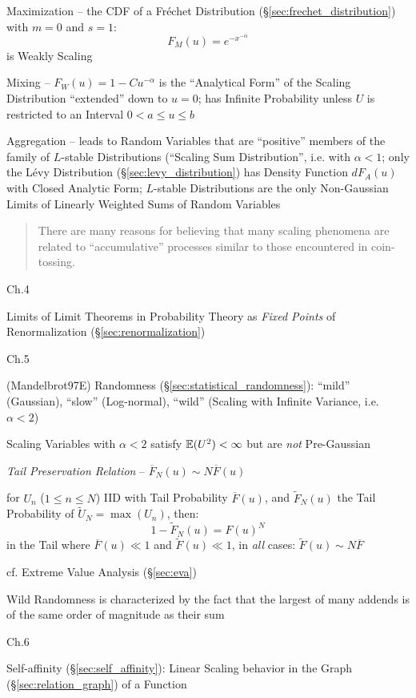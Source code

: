Maximization -- the CDF of a Fr\'echet Distribution
(\S\ref{sec:frechet_distribution}) with $m = 0$ and $s = 1$:
\[
  F_M(u) = e^{-x^{-\alpha}}
\]
is Weakly Scaling

Mixing -- $F_W(u) = 1 - Cu^{-\alpha}$ is the ``Analytical Form'' of the Scaling
Distribution ``extended'' down to $u = 0$; has Infinite Probability unless $U$
is restricted to an Interval $0 < a \leq u \leq b$

Aggregation -- leads to Random Variables that are ``positive'' members of the
family of $L$-stable Distributions (``Scaling Sum Distribution'', i.e. with
$\alpha < 1$; only the L\'evy Distribution (\S\ref{sec:levy_distribution}) has
Density Function $dF_A(u)$ with Closed Analytic Form; $L$-stable Distributions
are the only Non-Gaussian Limits of Linearly Weighted Sums of Random Variables

\begin{quote}
  There are many reasons for believing that many scaling phenomena are related
  to ``accumulative'' processes similar to those encountered in coin-tossing.
\end{quote}

Ch.4

Limits of Limit Theorems in Probability Theory as \emph{Fixed
  Points} of Renormalization (\S\ref{sec:renormalization})

Ch.5

(Mandelbrot97E) Randomness (\S\ref{sec:statistical_randomness}): ``mild''
(Gaussian), ``slow'' (Log-normal), ``wild'' (Scaling with Infinite Variance,
i.e. $\alpha < 2$)

Scaling Variables with $\alpha < 2$ satisfy $\mathbb{E}(U^2) < \infty$ but are
\emph{not} Pre-Gaussian

\emph{Tail Preservation Relation} -- $\overline{F}_N(u) \sim N \overline{F}(u)$

for $U_n$ ($1 \leq n \leq N$) IID with Tail Probability $\overline{F}(u)$, and
$\tilde{F}_N(u)$ the Tail Probability of $\tilde{U}_N = \max(U_n)$, then:
\[
  1 - \tilde{F}_N(u) = F(u)^N
\]
in the Tail where $\overline{F}(u) \ll 1$ and $\tilde{F}(u) \ll 1$, in
\emph{all} cases: $\tilde{F}(u) \sim N \overline{F}$

cf. Extreme Value Analysis (\S\ref{sec:eva})

Wild Randomness is characterized by the fact that the largest of many addends is
of the same order of magnitude as their sum

Ch.6

Self-affinity (\S\ref{sec:self_affinity}): Linear Scaling behavior in the Graph
(\S\ref{sec:relation_graph}) of a Function

